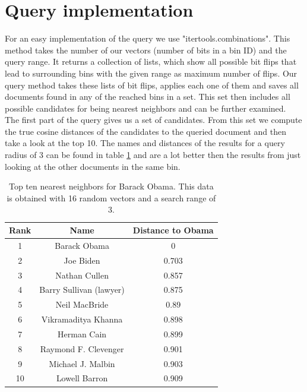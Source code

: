 \documentclass[12pt]{scrreprt}
\begin{document}
\section{Query implementation}
For an easy implementation of the query we use "itertools.combinations". This method takes the number of our vectors (number of bits in a bin ID) and the query range. It returns a collection of lists, which show all possible bit flips that lead to surrounding bins with the given range as maximum number of flips. Our query method takes these lists of bit flips, applies each one of them and saves all documents found in any of the reached bins in a set. This set then includes all possible candidates for being nearest neighbors and can be further examined.\\

The first part of the query gives us a set of candidates. From this set we compute the true cosine distances of the candidates to the queried document and then take a look at the top 10. The names and distances of the results for a query radius of 3 can be found in table \ref{tab:top_10_range_3} and are a lot better then the results from just looking at the other documents in the same bin.\\

\begin{table}[H]
  \caption{Top ten nearest neighbors for Barack Obama. This data is obtained with 16 random vectors and a search range of 3.}
  \label{tab:top_10_range_3}
  \begin{center}
    \begin{tabular}{| c | c | c |}
      \hline
      \textbf{Rank} & \textbf{Name} & \textbf{Distance to Obama}\\
      \hline
      \hline
      1 & Barack Obama & 0 \\ \hline
      2 & Joe Biden & 0.703 \\ \hline
      3 & Nathan Cullen & 0.857 \\ \hline
      4 & Barry Sullivan (lawyer) & 0.875 \\ \hline
      5 & Neil MacBride & 0.89 \\ \hline
      6 & Vikramaditya Khanna & 0.898 \\ \hline
      7 & Herman Cain & 0.899 \\ \hline
      8 & Raymond F. Clevenger & 0.901 \\ \hline
      9 & Michael J. Malbin & 0.903 \\ \hline
      10 & Lowell Barron & 0.909 \\ \hline
    \end{tabular}	
  \end{center}
\end{table}
\end{document}
